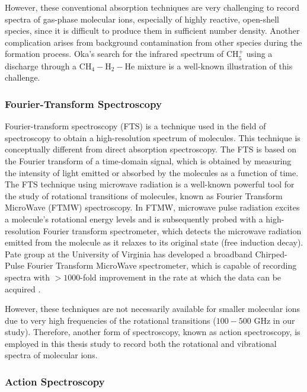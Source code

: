 However, these conventional absorption techniques are very challenging to
record spectra of gas-phase molecular ions, especially of highly reactive,
open-shell species, since it is difficult to produce them in sufficient
number density. Another complication arises from background contamination from
other species during the formation process. Oka's \cite{oka_taming_2015} search
for the infrared spectrum of CH$_5^+$ using a discharge through a
CH$_4-$H$_2-$He mixture is a well-known illustration of this challenge.

\subsubsection*{Fourier-Transform Spectroscopy}
Fourier-transform spectroscopy (FTS) is a technique used in the field of spectroscopy to obtain a high-resolution spectrum of molecules. 
This technique is conceptually different from direct absorption spectroscopy.
The FTS is based on the Fourier transform of a time-domain signal, which is obtained by 
measuring the intensity of light emitted or absorbed by the molecules as a function of time.
The FTS technique using microwave radiation is a well-known powerful tool for the study of rotational transitions of molecules, known as Fourier Transform MicroWave (FTMW) spectroscopy. In FTMW, microwave pulse radiation excites a molecule's rotational energy levels and is subsequently probed with a high-resolution Fourier transform spectrometer, which detects the microwave radiation emitted from the molecule as it relaxes to its original state (free induction decay). 
Pate group at the University of Virginia has developed a broadband Chirped-Pulse Fourier Transform MicroWave  spectrometer, which is capable of recording spectra with $>1000$-fold improvement in the rate at which the data can be acquired \cite{brown_rotational_2006, brown_broadband_2008, park_perspective_2016}.

However, these techniques are not necessarily available for smaller molecular ions due to 
very high frequencies of the rotational transitions ($100-500 $ GHz in our study).
Therefore, another form of spectroscopy, known as action spectroscopy, is employed in this thesis study to record both the rotational and vibrational spectra of molecular ions.

\subsubsection*{Action Spectroscopy}

